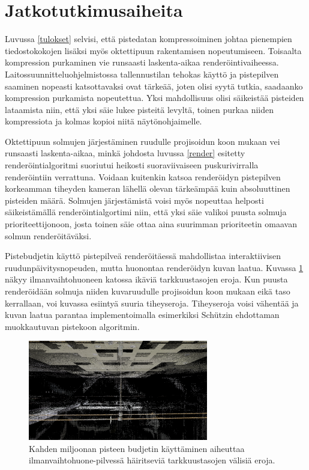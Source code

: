 \section{Jatkotutkimusaiheita}

Luvussa \ref{tulokset} selvisi, että pistedatan kompressoiminen johtaa pienempien tiedostokokojen lisäksi myös oktettipuun rakentamisen nopeutumiseen. Toisaalta kompression purkaminen vie runsaasti laskenta-aikaa renderöintivaiheessa. Laitossuunnitteluohjelmistossa tallennustilan tehokas käyttö ja pistepilven saaminen nopeasti katsottavaksi ovat tärkeää, joten olisi syytä tutkia, saadaanko kompression purkamista nopeutettua. Yksi mahdollisuus olisi säikeistää pisteiden lataamista niin, että yksi säie lukee pisteitä levyltä, toinen purkaa niiden kompressiota ja kolmas kopioi niitä näytönohjaimelle.

Oktettipuun solmujen järjestäminen ruudulle projisoidun koon mukaan vei runsaasti laskenta-aikaa, minkä johdosta luvussa \ref{render} esitetty renderöintialgoritmi suoriutui heikosti suoraviivaiseen puskurivirralla renderöintiin verrattuna. Voidaan kuitenkin katsoa renderöidyn pistepilven korkeamman tiheyden kameran lähellä olevan tärkeämpää kuin absoluuttinen pisteiden määrä. Solmujen järjestämistä voisi myös nopeuttaa helposti säikeistämällä renderöintialgortimi niin, että yksi säie valikoi puusta solmuja prioriteettijonoon, josta toinen säie ottaa aina suurimman prioriteetin omaavan solmun renderöitäväksi.

Pistebudjetin käyttö pistepilveä renderöitäessä mahdollistaa interaktiivisen ruudunpäivitysnopeuden, mutta huonontaa renderöidyn kuvan laatua. Kuvassa \ref{lod_border} näkyy ilmanvaihtohuoneen katossa ikäviä tarkkuustasojen eroja. Kun puusta renderöidään solmuja niiden kuvaruudulle projisoidun koon mukaan eikä taso kerrallaan, voi kuvassa esiintyä suuria tiheyseroja. Tiheyseroja voisi vähentää ja kuvan laatua parantaa implementoimalla esimerkiksi Schützin \cite{potree} ehdottaman muokkautuvan pistekoon algoritmin. 

\begin{figure}
    \centering
    \includegraphics[width=0.7\textwidth]{tuloksia/ilmastointi_2M/ilmastointihuone_vesijohto_overviewbuf.png}
    \caption{Kahden miljoonan pisteen budjetin käyttäminen aiheuttaa ilmanvaihtohuone-pilvessä häiritseviä tarkkuustasojen välisiä eroja.}
    \label{lod_border}
\end{figure} 